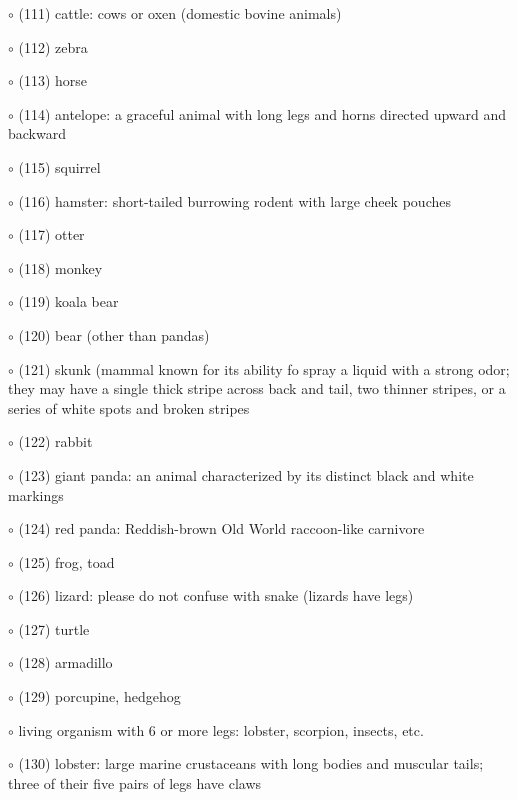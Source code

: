 \noindent \leftskip=1.25cm $\circ$ (111) cattle: cows or oxen (domestic bovine animals)

\noindent \leftskip=1.25cm $\circ$ (112) zebra

\noindent \leftskip=1.25cm $\circ$ (113) horse

\noindent \leftskip=1.25cm $\circ$ (114) antelope: a graceful animal with long legs and horns directed upward and backward

\noindent \leftskip=1.0cm $\circ$ (115) squirrel

\noindent \leftskip=1.0cm $\circ$ (116) hamster: short-tailed burrowing rodent with large cheek pouches

\noindent \leftskip=1.0cm $\circ$ (117) otter

\noindent \leftskip=1.0cm $\circ$ (118) monkey

\noindent \leftskip=1.0cm $\circ$ (119) koala bear

\noindent \leftskip=1.0cm $\circ$ (120) bear (other than pandas)

\noindent \leftskip=1.0cm $\circ$ (121) skunk (mammal known for its ability fo spray a liquid with a strong odor; they may have a single thick stripe across back and tail, two thinner stripes, or a series of white spots and broken stripes

\noindent \leftskip=1.0cm $\circ$ (122) rabbit

\noindent \leftskip=1.0cm $\circ$ (123) giant panda: an animal characterized by its distinct black and white markings

\noindent \leftskip=1.0cm $\circ$ (124) red panda: Reddish-brown Old World raccoon-like carnivore

\noindent \leftskip=0.75cm $\circ$ (125) frog, toad

\noindent \leftskip=0.75cm $\circ$ (126) lizard: please do not confuse with snake (lizards have legs)

\noindent \leftskip=0.75cm $\circ$ (127) turtle

\noindent \leftskip=0.75cm $\circ$ (128) armadillo

\noindent \leftskip=0.75cm $\circ$ (129) porcupine, hedgehog

\noindent \leftskip=0.5cm $\circ$ living organism with 6 or more legs: lobster, scorpion, insects, etc.

\noindent \leftskip=0.75cm $\circ$ (130) lobster: large marine crustaceans with long bodies and muscular tails; three of their five pairs of legs have claws

